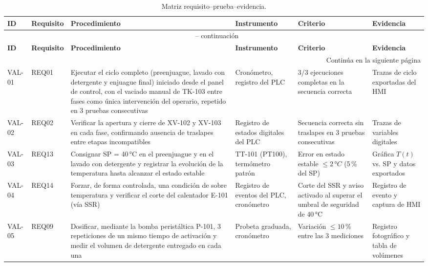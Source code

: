 \begin{longtable}{p{1.3cm} p{1.4cm} p{4.3cm} p{2.6cm} p{3.4cm} p{2.4cm}}
\caption{Matriz requisito--prueba--evidencia.}
\label{tab:matriz_validacion} \\
\toprule
\textbf{ID} & \textbf{Requisito} & \textbf{Procedimiento} & \textbf{Instrumento} & \textbf{Criterio} & \textbf{Evidencia} \\
\midrule
\endfirsthead

\multicolumn{6}{c}{\tablename\ \thetable{} -- continuación} \\
\toprule
\textbf{ID} & \textbf{Requisito} & \textbf{Procedimiento} & \textbf{Instrumento} & \textbf{Criterio} & \textbf{Evidencia} \\
\midrule
\endhead

\midrule
\multicolumn{6}{r}{Continúa en la siguiente página} \\
\endfoot

\bottomrule
\endlastfoot

VAL-01 & REQ01 & Ejecutar el ciclo completo (preenjuague, lavado con detergente y enjuague final) iniciado desde el panel de control, con el vaciado manual de TK-103 entre fases como única intervención del operario, repetido en 3 pruebas consecutivas & Cronómetro, registro del PLC & 3/3 ejecuciones completas en la secuencia correcta & Trazas de ciclo exportadas del HMI \\

VAL-02 & REQ02 & Verificar la apertura y cierre de XV-102 y XV-103 en cada fase, confirmando ausencia de traslapes entre etapas incompatibles & Registro de estados digitales del PLC & Secuencia correcta sin traslapes en 3 pruebas consecutivas & Trazas de variables digitales \\

VAL-03 & REQ13 & Consignar SP = 40\,°C en el preenjuague y en el lavado con detergente y registrar la evolución de la temperatura hasta alcanzar el estado estable & TT-101 (PT100), termómetro patrón & Error en estado estable $\leq 2\,°C$ (5\,\% del SP) & Gráfica $T(t)$ vs. SP y datos exportados \\

VAL-04 & REQ14 & Forzar, de forma controlada, una condición de sobre temperatura y verificar el corte del calentador E-101 (vía SSR)  & Registro de eventos del PLC, cronómetro & Corte del SSR y aviso activado al superar el umbral de seguridad de 40\,°C & Registro de evento y captura de HMI \\

VAL-05 & REQ09 & Dosificar, mediante la bomba peristáltica P-101, 3 repeticiones de un mismo tiempo de activación y medir el volumen de detergente entregado en cada una & Probeta graduada, cronómetro & Variación $\leq 10\,\%$ entre las 3 mediciones & Registro fotográfico y tabla de volúmenes \\


\end{longtable}
